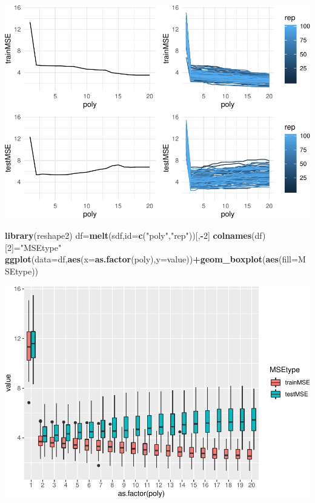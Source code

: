 \documentclass[]{article}
\newenvironment{Shaded}{\begin{snugshade}}{\end{snugshade}}
\newcommand{\KeywordTok}[1]{\textcolor[rgb]{0.13,0.29,0.53}{\textbf{#1}}}
\newcommand{\DataTypeTok}[1]{\textcolor[rgb]{0.13,0.29,0.53}{#1}}
\newcommand{\DecValTok}[1]{\textcolor[rgb]{0.00,0.00,0.81}{#1}}
\newcommand{\StringTok}[1]{\textcolor[rgb]{0.31,0.60,0.02}{#1}}
\newcommand{\OperatorTok}[1]{\textcolor[rgb]{0.81,0.36,0.00}{\textbf{#1}}}
\newcommand{\NormalTok}[1]{#1}
\begin{document}
\includegraphics{RecEx2-sol_files/figure-latex/unnamed-chunk-13-1.pdf}

\begin{Shaded}
\begin{Highlighting}[]
\KeywordTok{library}\NormalTok{(reshape2)}
\NormalTok{df=}\KeywordTok{melt}\NormalTok{(sdf,}\DataTypeTok{id=}\KeywordTok{c}\NormalTok{(}\StringTok{"poly"}\NormalTok{,}\StringTok{"rep"}\NormalTok{))[,}\OperatorTok{-}\DecValTok{2}\NormalTok{]}
\KeywordTok{colnames}\NormalTok{(df)[}\DecValTok{2}\NormalTok{]=}\StringTok{"MSEtype"}
\KeywordTok{ggplot}\NormalTok{(}\DataTypeTok{data=}\NormalTok{df,}\KeywordTok{aes}\NormalTok{(}\DataTypeTok{x=}\KeywordTok{as.factor}\NormalTok{(poly),}\DataTypeTok{y=}\NormalTok{value))}\OperatorTok{+}\KeywordTok{geom_boxplot}\NormalTok{(}\KeywordTok{aes}\NormalTok{(}\DataTypeTok{fill=}\NormalTok{MSEtype))}
\end{Highlighting}
\end{Shaded}

\includegraphics{RecEx2-sol_files/figure-latex/unnamed-chunk-13-2.pdf}
\end{document}
